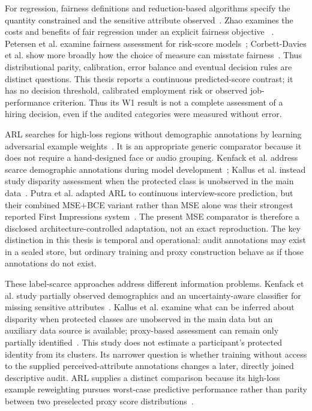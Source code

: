 For regression, fairness definitions and reduction-based algorithms specify
the quantity constrained and the sensitive attribute observed~\cite{Agarwal2019FairRegression}.
Zhao examines the costs and benefits of fair regression under an explicit fairness objective
~\cite{Zhao2023FairRegression}. Petersen et al. examine fairness assessment for risk-score
models~\cite{Petersen2023RiskScores}; Corbett-Davies et al. show more broadly how the choice of
measure can misstate fairness~\cite{CorbettDavies2023}. Thus distributional parity, calibration,
error balance and eventual decision rules are distinct questions.
This thesis reports a continuous predicted-score contrast; it has no decision threshold,
calibrated employment risk or observed job-performance criterion. Thus its W1 result is not a
complete assessment of a hiring decision, even if the audited categories were measured without
error.

ARL searches for high-loss regions without demographic annotations by learning adversarial
example weights~\cite{Lahoti2020}. It is an appropriate generic comparator because it does not
require a hand-designed face or audio grouping. Kenfack et al. address scarce demographic
annotations during model development~\cite{Kenfack2024}; Kallus et al. instead study disparity
assessment when the protected class is unobserved in the main data~\cite{Kallus2022}.
Putra et al. adapted ARL to continuous interview-score prediction, but their combined MSE+BCE
variant rather than MSE alone was their strongest reported First Impressions system~\cite{Putra2024}.
The present MSE comparator is therefore a disclosed architecture-controlled adaptation, not an
exact reproduction.
The key distinction in this thesis is temporal and operational: audit annotations may exist in a
sealed store, but ordinary training and proxy construction behave as if those annotations do not
exist.

These label-scarce approaches address different information problems. Kenfack et al. study
partially observed demographics and an uncertainty-aware classifier for missing sensitive
attributes~\cite{Kenfack2024}. Kallus et al. examine what can be inferred about disparity when
protected classes are unobserved in the main data but an auxiliary data source is available;
proxy-based assessment can remain only partially identified~\cite{Kallus2022}. This study does
not estimate a participant's protected identity from its clusters. Its narrower question is
whether training without access to the supplied perceived-attribute annotations changes a later,
directly joined descriptive audit. ARL supplies a distinct comparison because its high-loss
example reweighting pursues worst-case predictive performance rather than parity between two
preselected proxy score distributions~\cite{Lahoti2020}.

